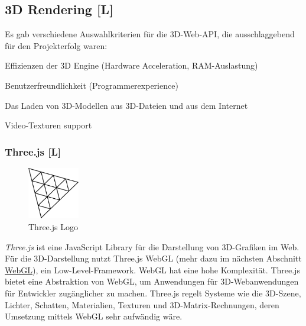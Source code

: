 \subsection{3D Rendering [L]}
Es gab verschiedene Auswahlkriterien für die 3D-Web-API, die ausschlaggebend für den Projekterfolg waren:
\begin{compactitem}
  \item Effizienzen der 3D Engine (Hardware Acceleration, RAM-Auslastung)
  \item Benutzerfreundlichkeit (Programmerexperience)
  \item Das Laden von 3D-Modellen aus 3D-Dateien und aus dem Internet
  \item Video-Texturen support
\end{compactitem}

\subsubsection{Three.js [L]}
\begin{figure}
    \begin{center}
      \includegraphics[width=0.2\textwidth]{pics/threeJS.png}
     \caption{Three.js Logo}
    \end{center}
\end{figure}
\emph{Three.js} ist eine JavaScript Library für die Darstellung von 3D-Grafiken im Web. Für die 3D-Darstellung nutzt Three.js WebGL (mehr dazu im nächsten Abschnitt \hyperref[ch::webgl]{WebGL}), ein Low-Level-Framework. WebGL hat eine hohe Komplexität. Three.js bietet eine Abstraktion von WebGL, um Anwendungen für 3D-Webanwendungen für Entwickler zugänglicher zu machen.
Three.js regelt Systeme wie die 3D-Szene, Lichter, Schatten, Materialien, Texturen und 3D-Matrix-Rechnungen, deren Umsetzung mittels WebGL sehr aufwändig wäre. \cite[Three.js fundamentals]{ThreeJsFund}

